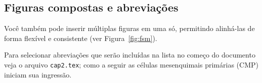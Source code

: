 \subsection{Figuras compostas e abreviações}\label{cap2:res:figs2}

Você também pode inserir múltiplas figuras em uma só, permitindo alinhá-las de forma flexível e consistente (ver Figura~\ref{fig:fsm}).

Para selecionar abreviações que serão incluídas na lista no começo do documento veja o arquivo \texttt{cap2.tex}; como a seguir as células mesenquimais primárias (CMP) iniciam sua ingressão.%

